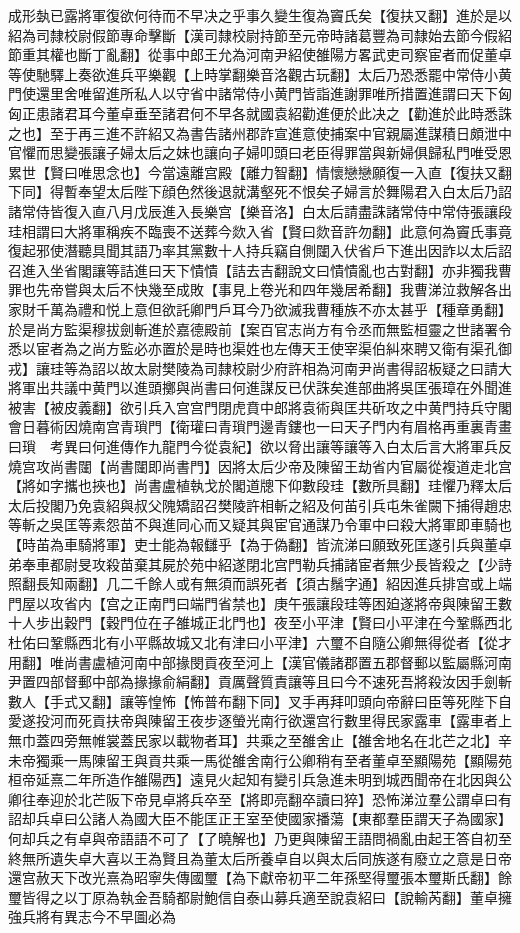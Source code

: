 成形埶已露將軍復欲何待而不早决之乎事久變生復為竇氏矣【復扶又翻】進於是以紹為司隸校尉假節專命擊斷【漢司隸校尉持節至元帝時諸葛豐為司隸始去節今假紹節重其權也斷丁亂翻】從事中郎王允為河南尹紹使雒陽方畧武吏司察宦者而促董卓等使馳驛上奏欲進兵平樂觀【上時掌翻樂音洛觀古玩翻】太后乃恐悉罷中常侍小黄門使還里舍唯留進所私人以守省中諸常侍小黄門皆詣進謝罪唯所措置進謂曰天下匈匈正患諸君耳今董卓垂至諸君何不早各就國袁紹勸進便於此决之【勸進於此時悉誅之也】至于再三進不許紹又為書告諸州郡詐宣進意使捕案中官親屬進謀積日頗泄中官懼而思變張讓子婦太后之妺也讓向子婦叩頭曰老臣得罪當與新婦俱歸私門唯受恩累世【賢曰唯思念也】今當遠離宫殿【離力智翻】情懷戀戀願復一入直【復扶又翻下同】得暫奉望太后陛下顔色然後退就溝壑死不恨矣子婦言於舞陽君入白太后乃詔諸常侍皆復入直八月戊辰進入長樂宫【樂音洛】白太后請盡誅諸常侍中常侍張讓段珪相謂曰大將軍稱疾不臨喪不送葬今欻入省【賢曰欻音許勿翻】此意何為竇氏事竟復起邪使潛聽具聞其語乃率其黨數十人持兵竊自側闥入伏省戶下進出因詐以太后詔召進入坐省閣讓等詰進曰天下憒憒【詰去吉翻說文曰憒憒亂也古對翻】亦非獨我曹罪也先帝嘗與太后不快幾至成敗【事見上卷光和四年幾居希翻】我曹涕泣救解各出家財千萬為禮和悦上意但欲託卿門戶耳今乃欲滅我曹種族不亦太甚乎【種章勇翻】於是尚方監渠穆拔劍斬進於嘉德殿前【案百官志尚方有令丞而無監桓靈之世諸署令悉以宦者為之尚方監必亦置於是時也渠姓也左傳天王使宰渠伯糾來聘又衛有渠孔御戎】讓珪等為詔以故太尉樊陵為司隸校尉少府許相為河南尹尚書得詔板疑之曰請大將軍出共議中黄門以進頭擲與尚書曰何進謀反已伏誅矣進部曲將吳匡張璋在外聞進被害【被皮義翻】欲引兵入宫宫門閉虎賁中郎將袁術與匡共斫攻之中黄門持兵守閣會日暮術因燒南宫青瑣門【衛瓘曰青瑣門邊青鏤也一曰天子門内有眉格再重裏青畫曰瑣　考異曰何進傳作九龍門今從袁紀】欲以脅出讓等讓等入白太后言大將軍兵反燒宫攻尚書闥【尚書闥即尚書門】因將太后少帝及陳留王劫省内官屬從複道走北宫【將如字攜也挾也】尚書盧植執戈於閣道牕下仰數段珪【數所具翻】珪懼乃釋太后太后投閣乃免袁紹與叔父隗矯詔召樊陵許相斬之紹及何苖引兵屯朱雀闕下捕得趙忠等斬之吳匡等素怨苗不與進同心而又疑其與宦官通謀乃令軍中曰殺大將軍即車騎也【時苖為車騎將軍】吏士能為報讎乎【為于偽翻】皆流涕曰願致死匡遂引兵與董卓弟奉車都尉旻攻殺苗棄其屍於苑中紹遂閉北宫門勒兵捕諸宦者無少長皆殺之【少詩照翻長知兩翻】几二千餘人或有無須而誤死者【須古鬚字通】紹因進兵排宫或上端門屋以攻省内【宫之正南門曰端門省禁也】庚午張讓段珪等困廹遂將帝與陳留王數十人步出穀門【穀門位在子雒城正北門也】夜至小平津【賢曰小平津在今鞏縣西北杜佑曰鞏縣西北有小平縣故城又北有津曰小平津】六璽不自隨公卿無得從者【從才用翻】唯尚書盧植河南中部掾閔貢夜至河上【漢官儀諸郡置五郡督郵以監屬縣河南尹置四部督郵中部為掾掾俞絹翻】貢厲聲質責讓等且曰今不速死吾將殺汝因手劍斬數人【手式又翻】讓等惶怖【怖普布翻下同】叉手再拜叩頭向帝辭曰臣等死陛下自愛遂投河而死貢扶帝與陳留王夜步逐螢光南行欲還宫行數里得民家露車【露車者上無巾蓋四旁無帷裳蓋民家以載物者耳】共乘之至雒舍止【雒舍地名在北芒之北】辛未帝獨乘一馬陳留王與貢共乘一馬從雒舍南行公卿稍有至者董卓至顯陽苑【顯陽苑桓帝延熹二年所造作雒陽西】遠見火起知有變引兵急進未明到城西聞帝在北因與公卿往奉迎於北芒阪下帝見卓將兵卒至【將即亮翻卒讀曰猝】恐怖涕泣羣公謂卓曰有詔却兵卓曰公諸人為國大臣不能匡正王室至使國家播蕩【東都羣臣謂天子為國家】何却兵之有卓與帝語語不可了【了曉解也】乃更與陳留王語問禍亂由起王答自初至終無所遺失卓大喜以王為賢且為董太后所養卓自以與太后同族遂有廢立之意是日帝還宫赦天下改光熹為昭寧失傳國璽【為下獻帝初平二年孫堅得璽張本璽斯氏翻】餘璽皆得之以丁原為執金吾騎都尉鮑信自泰山募兵適至說袁紹曰【說輸芮翻】董卓擁強兵將有異志今不早圖必為